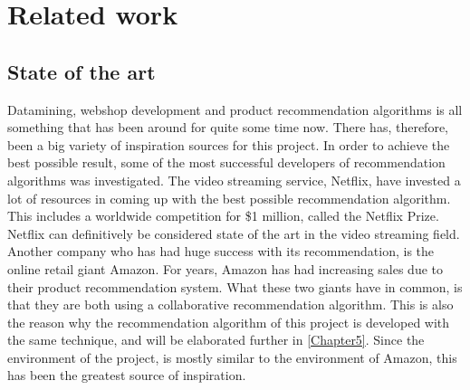 
\chapter{Related work} %

\label{Chapter3} %


\section{State of the art}

Datamining, webshop development and product recommendation algorithms is all something that has been around for quite some time now. There has, therefore, been a big variety of inspiration sources for this project. In order to achieve the best possible result, some of the most successful developers of recommendation algorithms was investigated. The video streaming service, Netflix, have invested a lot of resources in coming up with the best possible recommendation algorithm.\cite{Netflix} This includes a worldwide competition for \$1 million, called the Netflix Prize. \cite{NetflixPrize} Netflix can definitively be considered state of the art in the video streaming field. Another company who has had huge success with its recommendation, is the online retail giant Amazon. For years, Amazon has had increasing sales due to their product recommendation system.\cite{AmazonSuccess} What these two giants have in common, is that they are both using a collaborative recommendation algorithm. This is also the reason why the recommendation algorithm of this project is developed with the same technique, and will be elaborated further in \ref{Chapter5}. Since the environment of the project, is mostly similar to the environment of Amazon, this has been the greatest source of inspiration. 


